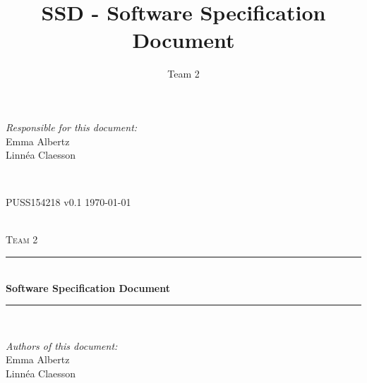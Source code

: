 \documentclass[a4paper]{article}
\title{SSD - Software Specification Document}
\author{Team 2}
\begin{document}
\begin{titlepage}
\newcommand{\HRule}{\rule{\linewidth}{0.5mm}}

\begin{minipage}{0.5\textwidth}
\begin{flushleft} %
\textit{Responsible for this document:}\\
Emma Albertz \\
Linnéa Claesson
\end{flushleft}
\end{minipage}
~
\begin{minipage}{0.4\textwidth}
\begin{flushright}
PUSS154218 v0.1 
\today
\end{flushright}
\end{minipage}\\[3cm]

\centering
\textsc{\LARGE Team 2}\\[0.5cm]

\HRule \\[0.4cm]
{ \huge \bfseries Software Specification Document}\\[0.4cm] %
\HRule \\[1.5cm]

\vfill
\begin{flushleft}
\textit{Authors of this document:}\\
Emma Albertz \\
Linnéa Claesson
\end{flushleft}



\end{titlepage}



%



\setcounter{tocdepth}{2}
\tableofcontents
\newpage
{}
\end{document}
